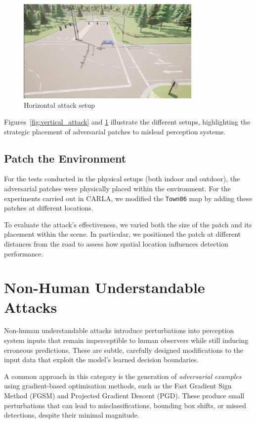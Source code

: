 \begin{figure}[ht]
    \centering
    \includegraphics[width=0.8\textwidth]{figures/attacks_framework/hori_attack.png}
    \caption{Horizontal attack setup}
    \label{fig:horizontal_attack}
\end{figure}

Figures~\ref{fig:vertical_attack} and \ref{fig:horizontal_attack} illustrate the different setups, highlighting the strategic placement of adversarial patches to mislead perception systems.

\subsection{Patch the Environment}

For the tests conducted in the physical setups (both indoor and outdoor), the adversarial patches were physically placed within the environment.
For the experiments carried out in CARLA, we modified the \texttt{Town06} map by adding these patches at different locations.

To evaluate the attack’s effectiveness, we varied both the size of the patch and its placement within the scene.
In particular, we positioned the patch at different distances from the road to assess how spatial location influences detection performance.

\section{Non-Human Understandable Attacks}

Non-human understandable attacks introduce perturbations into perception system inputs that remain imperceptible to human observers while still inducing erroneous predictions.
These are subtle, carefully designed modifications to the input data that exploit the model’s learned decision boundaries.

A common approach in this category is the generation of \textit{adversarial examples} using gradient-based optimisation methods, such as the Fast Gradient Sign Method (FGSM) and Projected Gradient Descent (PGD).
These produce small perturbations that can lead to misclassifications, bounding box shifts, or missed detections, despite their minimal magnitude.

